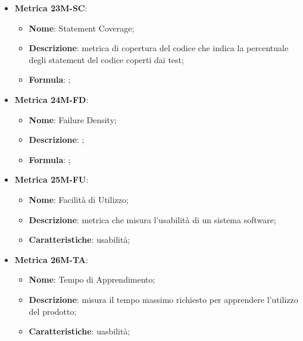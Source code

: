 \begin{itemize}
    \item \textbf{Metrica 23M-SC}:
    \begin{itemize}
        \item \textbf{Nome}: Statement Coverage;
        \item \textbf{Descrizione}: metrica di copertura del codice che indica la percentuale degli statement del codice coperti dai test;
        \item \textbf{Formula}: ;
    \end{itemize}
\end{itemize}

\begin{itemize}
    \item \textbf{Metrica 24M-FD}:
    \begin{itemize}
        \item \textbf{Nome}: Failure Density;
        \item \textbf{Descrizione}: ;
        \item \textbf{Formula}: ;
    \end{itemize}
\end{itemize}

\begin{itemize}
    \item \textbf{Metrica 25M-FU}:
    \begin{itemize}
        \item \textbf{Nome}: Facilità di Utilizzo;
        \item \textbf{Descrizione}: metrica che misura l'usabilità di un sistema software;
        \item \textbf{Caratteristiche}: usabilità;
    \end{itemize}
\end{itemize}

\begin{itemize}
    \item \textbf{Metrica 26M-TA}:
    \begin{itemize}
        \item \textbf{Nome}: Tempo di Apprendimento;
        \item \textbf{Descrizione}: misura il tempo massimo richiesto per apprendere l'utilizzo del prodotto;
        \item \textbf{Caratteristiche}: uasbilità;
    \end{itemize}
\end{itemize}

